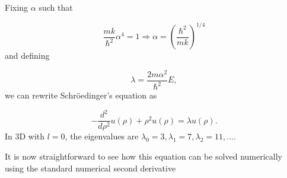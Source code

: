 \documentclass[10pt,showpacs,preprintnumbers,footinbib,amsmath,amssymb,aps,prl,twocolumn,groupedaddress,superscriptaddress,showkeys]{revtex4-1}
\begin{document}
Fixing $\alpha$ such that

\begin{equation*}
\frac{mk}{\hbar^2} \alpha^4 = 1 \Rightarrow \alpha = \left(\frac{\hbar^2}{mk}\right)^{1/4}
\end{equation*}
and defining

\begin{equation*}
\lambda = \frac{2m\alpha^2}{\hbar^2}E,
\end{equation*}
we can rewrite Schr\"{o}edinger's equation as

\begin{equation*}
  -\frac{d^2}{d\rho^2} u(\rho) + \rho^2u(\rho)  = \lambda u(\rho) .
\end{equation*}
In 3D with $l=0$, the eigenvalues are
$\lambda_0=3,\lambda_1=7,\lambda_2=11,\dots .$

It is now straightforward to see how this equation can be solved numerically using the standard
numerical second derivative
\end{document}
